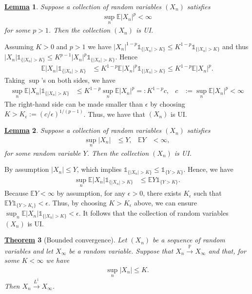\documentclass[12pt]{book}
\let\varepsilon\epsilon
\numberwithin{equation}{chapter}
\theoremstyle{plain}
\newtheorem{theorem}{\underline{Theorem}}
\numberwithin{theorem}{section}
\newtheorem{lemma}[theorem]{\underline{Lemma}}   		%
\theoremstyle{definition}
\numberwithin{exercise}{chapter}
\let\oldendproof\endproof
\renewenvironment{proof}[1][\proofname]{%
  \oldproof[\scshape\underline{#1}]%
}{\oldendproof}
\newcommand{\<}{\langle}
\renewcommand{\>}{\rangle}
\renewcommand{\(}{\left(}
\renewcommand{\)}{\right)}
\renewcommand{\[}{\left[}
\renewcommand{\]}{\right]}
\newcommand\Eb{\mathds{E}}
\newcommand\Ib{\mathds{1}} 	%
\newcommand\Pb{\mathds{P}}
\newcommand\eps{\varepsilon}
\begin{document}
\begin{lemma}
Suppose a collection of random variables $(X_n)$ satisfies
\begin{align}
\sup_{n} \Eb |X_n|^p
	< \infty
\end{align}
for some $p>1$.  Then the collection $(X_n)$ is UI.
\end{lemma}

\begin{proof}
Assuming $K>0$ and $p>1$ we have $|X_n|^{1-p} \Ib_{\{|X_n| > K \}}  \leq K^{1-p} \Ib_{\{|X_n| > K \}}$ and thus $|X_n| \Ib_{\{|X_n| > K \}}  \leq K^{p-1} |X_n|^p \Ib_{\{|X_n| > K \}} $.  Hence
\begin{align}
\Eb |X_n| \Ib_{\{|X_n|>K\}}
	&\leq K^{1-p} \Eb |X_n|^p \Ib_{\{|X_n|>K\}}
	\leq K^{1-p} \Eb |X_n|^p .
\end{align}
Taking $\sup$'s on both sides, we have
\begin{align}
\sup_{n} \Eb |X_n| \Ib_{\{|X_n|>K\}}
	&\leq K^{1-p}  \sup_{n} \Eb |X_n|^p  =: K^{1-p} c , &
c
	&:=	\sup_{n} \Eb |X_n|^p < \infty
\end{align}
The right-hand side can be made smaller than $\eps$ by choosing $K  > K_\eps := (c/\eps)^{1/(p-1)}$.  Thus, we have that $(X_n)$ is UI.
\end{proof}

\begin{lemma}
Suppose a collection of random variables $(X_n)$ satisfies
\begin{align}
\sup_{n} |X_n| 
	&\leq Y , &
\Eb Y
	&< \infty ,
\end{align}
for some random variable $Y$.  Then the collection $(X_n)$ is UI.
\end{lemma}

\begin{proof}
By assumption $|X_n| \leq Y$, which implies $ \Ib_{\{|X_n|>K\}} \leq  \Ib_{\{Y>K\}}$.  Hence, 
we have
\begin{align}
\sup_{n} \Eb |X_n| \Ib_{\{|X_n|>K\}}
	&\leq \Eb Y \Ib_{\{Y>K\}}  .
\end{align}
Because $\Eb Y < \infty$ by assumption, for any $\eps > 0$, there exists $K_\eps$ such that $\Eb Y \Ib_{\{Y>K_\eps\}} < \eps$.
Thus, by choosing $K > K_\eps$ above, we can ensure $\sup_n \Eb |X_n| \Ib_{\{|X_n|>K\}} < \eps$.  It follows that the collection of random variables $(X_n)$ is UI.
\end{proof}

\begin{theorem}[Bounded convergence]
\label{thm:bdd}
Let $(X_n)$ be a sequence of random variables and let $X_\infty$ be a random variable.  Suppose that $X_n \stackrel{\Pb}{\to} X_\infty$ and that, for some $K<\infty$ we have
\begin{align}
\sup_n |X_n| \leq K .
\end{align}
Then $X_n \stackrel{L^1}{\to} X_\infty$.
\end{theorem}
\end{document}

